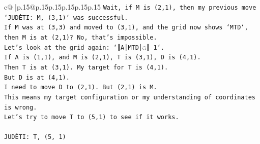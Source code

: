 \documentclass{article}
\begin{document}
{\begin{supertabular}{c@{$\;$}|p{.15\linewidth}@{}p{.15\linewidth}p{.15\linewidth}p{.15\linewidth}p{.15\linewidth}p{.15\linewidth}}
{{{\texttt{Wait, if M is (2,1), then my previous move `JUDĖTI: M, (3,1)` was successful.} \\
\texttt{If M was at (3,3) and moved to (3,1), and the grid now shows `MTD`, then M is at (2,1)? No, that's impossible.} \\
\texttt{Let's look at the grid again: `║A│MTD│◌║ 1`.} \\
\texttt{If A is (1,1), and M is (2,1), T is (3,1), D is (4,1).} \\
\texttt{Then T is at (3,1). My target for T is (4,1).} \\
\texttt{But D is at (4,1).} \\
\texttt{I need to move D to (2,1). But (2,1) is M.} \\
\texttt{This means my target configuration or my understanding of coordinates is wrong.} \\
\texttt{Let's try to move T to (5,1) to see if it works.} \\
\\ 
\texttt{JUDĖTI: T, (5, 1)} \\
            }
        }
    }
     \\ \\


\end{supertabular}}
\end{document}
